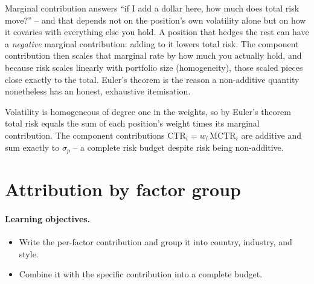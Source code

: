 \documentclass[11pt]{article}
\theoremstyle{definition}
\theoremstyle{plain}
\theoremstyle{remark}
\begin{document}
\begin{intuition}
Marginal contribution answers ``if I add a dollar here, how much does total risk move?'' -- and that depends not on the position's own volatility alone but on how it covaries with everything else you hold. A position that hedges the rest can have a \emph{negative} marginal contribution: adding to it lowers total risk. The component contribution then scales that marginal rate by how much you actually hold, and because risk scales linearly with portfolio size (homogeneity), those scaled pieces close exactly to the total. Euler's theorem is the reason a non-additive quantity nonetheless has an honest, exhaustive itemisation.
\end{intuition}

\begin{keyresult}
Volatility is homogeneous of degree one in the weights, so by Euler's theorem total risk equals the sum of each position's weight times its marginal contribution. The component contributions $\text{CTR}_i=w_i\,\text{MCTR}_i$ are additive and sum exactly to $\sigma_p$ -- a complete risk budget despite risk being non-additive.
\end{keyresult}

\section{Attribution by factor group}\label{sec:groups}

\paragraph{Learning objectives.}
\begin{itemize}[leftmargin=1.4em,topsep=2pt]
  \item Write the per-factor contribution and group it into country, industry, and style.
  \item Combine it with the specific contribution into a complete budget.
\end{itemize}
\end{document}
